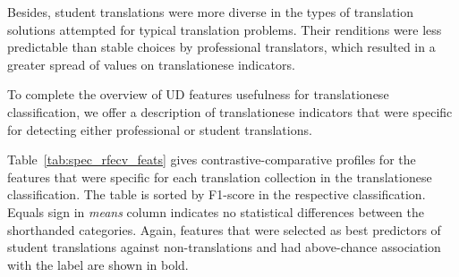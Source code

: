 Besides, student translations were more diverse in the types of translation solutions attempted for typical translation problems. Their renditions were less predictable than stable choices by professional translators, which resulted in a greater spread of values on translationese indicators. 



To complete the overview of UD features usefulness for translationese classification, we offer a description of translationese indicators that were specific for detecting either professional or student translations.  

Table~\ref{tab:spec_rfecv_feats} gives contrastive-comparative profiles for the features that were specific for each translation collection in the translationese classification. The table is sorted by F1-score in the respective classification. Equals sign in \textit{means} column indicates no statistical differences between the shorthanded categories. Again, features that were selected as best predictors of student translations against non-translations and had above-chance association with the label are shown in bold.



